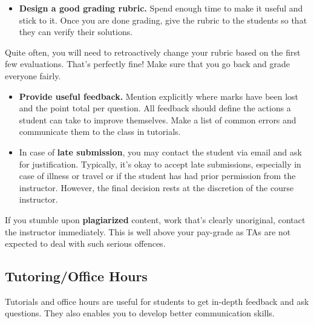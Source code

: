 \begin{itemize}[leftmargin=10pt]
    \item \textbf{Design a good grading rubric.} Spend enough time to make it useful and stick to it. Once you are done grading, give the rubric to the students so that they can verify their solutions.
\end{itemize}
\begin{plaincorollary}
    Quite often, you will need to retroactively change your rubric based on the first few evaluations. That's perfectly fine! Make sure that you go back and grade everyone fairly.
\end{plaincorollary}
\begin{itemize}[leftmargin=10pt]
    \item \textbf{Provide useful feedback.}  Mention explicitly where marks have been lost and the point total per question. All feedback should define the actions a student can take to improve themselves. Make a list of common errors and communicate them to the class in tutorials.\\
    \item In case of \textbf{late submission}, you may contact the student via email and ask for justification. Typically, it's okay to accept late submissions, especially in case of illness or travel or if the student has had prior permission from the instructor. However, the final decision rests at the discretion of the course instructor.\vspace{5pt}
\end{itemize}
\begin{plainexercise}
If you stumble upon \textbf{plagiarized} content, work that's clearly unoriginal, contact the instructor immediately. This is well above your pay-grade as TAs are not expected to deal with such serious offences. 
\end{plainexercise}

\subsection{Tutoring/Office Hours}
Tutorials and office hours are useful for students to get in-depth feedback and ask questions. They also enables you to develop better communication skills.

